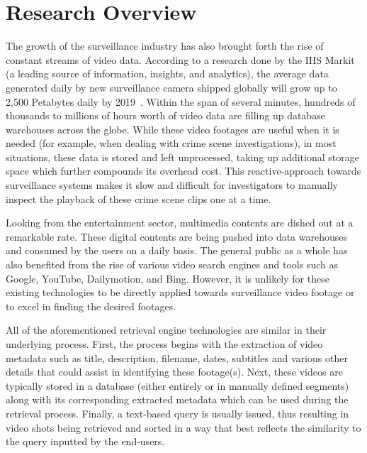 \section{Research Overview}
\label{section:introduction}

The growth of the surveillance industry has also brought forth the rise of constant streams of video data. According to a research done by the IHS Markit (a leading source of information, insights, and analytics), the average data generated daily by new surveillance camera shipped globally will grow up to 2,500 Petabytes daily by 2019~\cite{woodhouse2016big}.
Within the span of several minutes, hundreds of thousands %
to millions of hours worth of video data are filling up database warehouses across the globe.
While these video footages are useful when it is needed (for example, when dealing with crime scene investigations), in most situations, these data is stored and left unprocessed, taking up additional storage space which further compounds its overhead cost.
This reactive-approach towards surveillance systems makes it slow and difficult for investigators to manually inspect the playback of these crime scene clips one at a time.

Looking from the entertainment sector, multimedia contents are dished out at a remarkable rate. These digital contents are being pushed into data warehouses and consumed by the users on a daily basis. The general public as a whole has also benefited from the rise of various video search engines and tools such as Google, YouTube, Dailymotion, and Bing. However, it is unlikely for these existing technologies to be directly applied towards surveillance video footage or to excel in finding the desired footages.

All of the aforementioned retrieval engine technologies are similar 
in their underlying process. First, the process begins with the extraction of video metadata such as title, description, filename, dates, subtitles and various other details that could assist in identifying these footage(s). Next, these videos are typically stored in a database (either entirely or in manually defined segments) along with its corresponding extracted metadata which can be used during the retrieval process. Finally, a text-based query is usually issued, thus resulting in video shots being retrieved and sorted in a way that best 
reflects the similarity to
the query inputted by the end-users.

